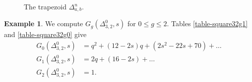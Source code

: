 \documentclass[11pt]{article}
\theoremstyle{definition}
\newtheorem{exam}[theo]{Example}
\numberwithin{equation}{section}
\theoremstyle{plain}
\begin{document}
\begin{figure}[h]
	\centering
{}
    \caption{The trapezoid $\Delta^n_ {a,b}$.}
    \label{fig-trapeze-Hirz}
\end{figure}



\begin{exam} \label{ex-square32}
We compute $G_g(\Delta^0_{3,2},s)$ for $0 \leqslant g \leqslant 2$. Tables \ref{table-square32g1} and \ref{table-square32g0} give
\begin{align*}
G_0(\Delta^0_{3,2},s) &= q^2 + (12-2s)q + (2s^2-22s+70) + \dots  \\
G_1(\Delta^0_{3,2},s) &= 2q + (16-2s) + \dots \\
G_2(\Delta^0_{3,2},s) &= 1 .
\end{align*}
\end{exam}
\end{document}
